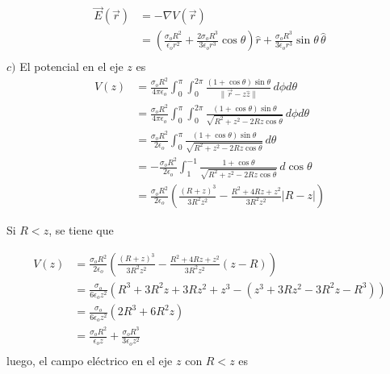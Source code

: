 \begin{equation}
\begin{split}
    \Vec{E}(\Vec{r}) &= -\nabla V(\Vec{r})\\
    &= \left(\frac{\sigma_oR^2}{\epsilon_o r^2}+
    \frac{2\sigma_oR^3}{3\epsilon_or^3}\cos{\theta}\right)\hat{r}+
    \frac{\sigma_oR^3}{3\epsilon_or^3}\sin{\theta}\,
    \hat{\theta}\\
\end{split}
\nonumber
\end{equation}
\medbreak
$c)$ El potencial en el eje $z$ es
\begin{equation}
\begin{split}
    V(z) &= \frac{\sigma_oR^2}{4\pi\epsilon_o}\int^\pi_0
    \int^{2\pi}_0\frac{(1+\cos{\theta})\sin{\theta}}{\|\Vec{r}-z\hat{z}\|}\,d\phi d\theta\\
    &= \frac{\sigma_oR^2}{4\pi\epsilon_o}\int^\pi_0
    \int^{2\pi}_0\frac{(1+\cos{\theta})\sin{\theta}}{\sqrt{R^2+z^2-2Rz\cos{\theta}}}\,d\phi d\theta\\
    &= \frac{\sigma_oR^2}{2\epsilon_o}\int^\pi_0
    \frac{(1+\cos{\theta})\sin{\theta}}{\sqrt{R^2+z^2-2Rz\cos{\theta}}}\,d\theta\\
    &= -\frac{\sigma_oR^2}{2\epsilon_o}\int^{-1}_1
    \frac{1+\cos{\theta}}{\sqrt{R^2+z^2-2Rz\cos{\theta}}}
    \,d\cos{\theta}\\
    &=\frac{\sigma_oR^2}{2\epsilon_o}\left(
    \frac{(R+z)^3}{3R^2z^2}-\frac{R^2+4Rz+z^2}{3R^2z^2}
    |R-z|\right)
\end{split}
\nonumber
\end{equation}
\medbreak

Si $R<z$, se tiene que

\begin{equation}
\begin{split}
    V(z) &= \frac{\sigma_oR^2}{2\epsilon_o}\left(
    \frac{(R+z)^3}{3R^2z^2}-\frac{R^2+4Rz+z^2}{3R^2z^2}
    (z-R)\right)\\
    &= \frac{\sigma_o}{6\epsilon_oz^2}(R^3+3R^2z+3Rz^2+z^3-
    (z^3+3Rz^2-3R^2z-R^3))\\
    &= \frac{\sigma_o}{6\epsilon_oz^2}(2R^3+6R^2z)\\
    &= \frac{\sigma_oR^2}{\epsilon_oz}+
    \frac{\sigma_oR^3}{3\epsilon_oz^2}\\
\end{split}
\nonumber
\end{equation}
\medbreak
luego, el campo eléctrico en el eje $z$ con $R<z$ es

